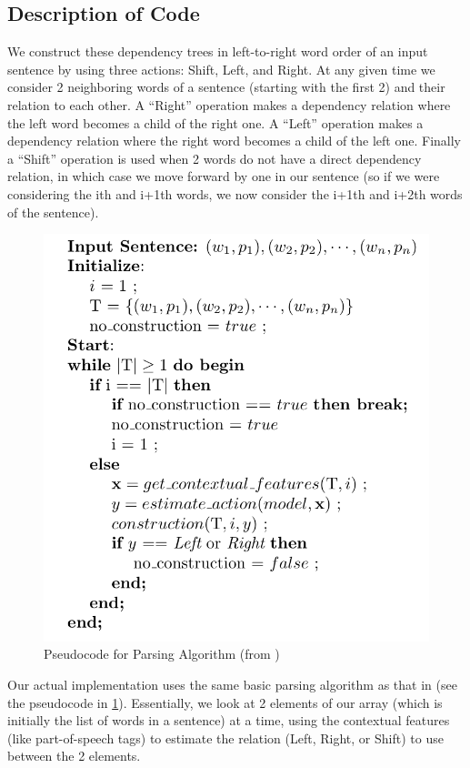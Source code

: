 \documentclass[12pt]{amsart}
\begin{document}
\subsection{Description of Code}
We construct these dependency trees in left-to-right word order of an input sentence
by using three actions: Shift, Left, and Right. At any given time we consider 2 neighboring words
of a sentence (starting with the first 2) and their relation to each other. A ``Right''
operation makes a dependency relation where the left word becomes a child of 
the right one. A ``Left'' operation makes a dependency relation where the right word
becomes a child of the left one. Finally a ``Shift'' operation is used when 2 words
do not have a direct dependency relation, in which case we move forward by one in our
sentence (so if we were considering the ith and i+1th words, we now consider the i+1th
and i+2th words of the sentence). 

\begin{figure}
\label{pseudocode}
\caption{Pseudocode for Parsing Algorithm (from \cite{yamada2003statistical})}
\center
\includegraphics[scale=.75]{pseudocode.png}
\end{figure}

Our actual implementation uses the same basic parsing algorithm as that in 
\cite{yamada2003statistical} (see the pseudocode in \ref{pseudocode}). Essentially, we look at
2 elements of our array (which is initially the list of words in a sentence)
at a time, using the contextual features (like part-of-speech tags) to estimate
the relation (Left, Right, or Shift) to use between the 2 elements.
\end{document}
